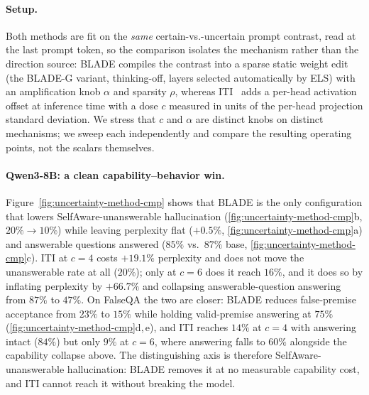 \paragraph{Setup.}
Both methods are fit on the \emph{same} certain-vs.-uncertain prompt contrast,
read at the last prompt token, so the comparison isolates the mechanism rather
than the direction source: BLADE compiles the contrast into a sparse static
weight edit (the BLADE-G variant, thinking-off, layers selected automatically by
ELS) with an amplification knob $\alpha$ and sparsity $\rho$, whereas
ITI~\citep{li2023iti} adds a per-head activation offset at inference time with a
dose $c$ measured in units of the per-head projection standard deviation. We
stress that $c$ and $\alpha$ are distinct knobs on distinct mechanisms; we sweep
each independently and compare the resulting operating points, not the
scalars themselves.

\paragraph{Qwen3-8B: a clean capability--behavior win.}
Figure~\ref{fig:uncertainty-method-cmp} shows that BLADE is the only
configuration that lowers SelfAware-unanswerable hallucination
(\ref{fig:uncertainty-method-cmp}b, $20\%\!\to\!10\%$) while leaving
perplexity flat ($+0.5\%$, \ref{fig:uncertainty-method-cmp}a) and answerable
questions answered ($85\%$ vs.\ $87\%$ base,
\ref{fig:uncertainty-method-cmp}c). ITI at $c\!=\!4$ costs $+19.1\%$
perplexity and does not move the unanswerable rate at all ($20\%$); only at
$c\!=\!6$ does it reach $16\%$, and it does so by inflating perplexity by
$+66.7\%$ and collapsing answerable-question answering from $87\%$ to $47\%$.
On FalseQA the two are closer: BLADE reduces false-premise acceptance from
$23\%$ to $15\%$ while holding valid-premise answering at $75\%$
(\ref{fig:uncertainty-method-cmp}d,\,e), and ITI reaches $14\%$ at $c\!=\!4$
with answering intact ($84\%$) but only $9\%$ at $c\!=\!6$, where answering
falls to $60\%$ alongside the capability collapse above. The distinguishing
axis is therefore SelfAware-unanswerable hallucination: BLADE removes it at no
measurable capability cost, and ITI cannot reach it without breaking the
model.


